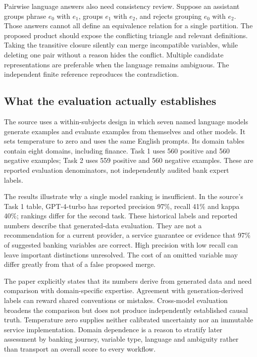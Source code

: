 Pairwise language answers also need consistency review. Suppose an assistant groups phrase $e_0$ with $e_1$, groups $e_1$ with $e_2$, and rejects grouping $e_0$ with $e_2$. Those answers cannot all define an equivalence relation for a single partition. The proposed product should expose the conflicting triangle and relevant definitions. Taking the transitive closure silently can merge incompatible variables, while deleting one pair without a reason hides the conflict. Multiple candidate representations are preferable when the language remains ambiguous. The independent finite reference reproduces the contradiction.~\citep{exec28_cm_reference}

\subsection{What the evaluation actually establishes}

The source uses a within-subjects design in which seven named language models generate examples and evaluate examples from themselves and other models. It sets temperature to zero and uses the same English prompts. Its domain tables contain eight domains, including finance. Task 1 uses 560 positive and 560 negative examples; Task 2 uses 559 positive and 560 negative examples. These are reported evaluation denominators, not independently audited bank expert labels.~\citep{exec28_cm_razouk}

The results illustrate why a single model ranking is insufficient. In the source's Task 1 table, GPT-4-turbo has reported precision 97\%, recall 41\% and kappa 40\%; rankings differ for the second task. These historical labels and reported numbers describe that generated-data evaluation. They are not a recommendation for a current provider, a service guarantee or evidence that 97\% of suggested banking variables are correct. High precision with low recall can leave important distinctions unresolved. The cost of an omitted variable may differ greatly from that of a false proposed merge.~\citep{exec28_cm_razouk}

The paper explicitly states that its numbers derive from generated data and need comparison with domain-specific expertise. Agreement with generation-derived labels can reward shared conventions or mistakes. Cross-model evaluation broadens the comparison but does not produce independently established causal truth. Temperature zero supplies neither calibrated uncertainty nor an immutable service implementation. Domain dependence is a reason to stratify later assessment by banking journey, variable type, language and ambiguity rather than transport an overall score to every workflow.

